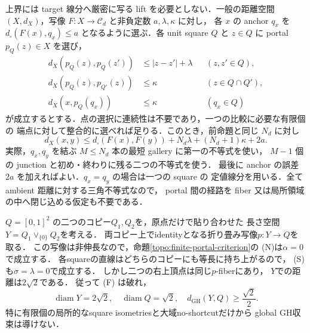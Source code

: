 \begin{remark}
\label{topo:finite-endpoint-comparison}
上界には target 線分へ厳密に写る lift を必要としない．一般の距離空間
$(X,d_X)$，写像 $F:X\to\mathcal C_d$ と非負定数 $a,\lambda,\kappa$ に対し，
各 $x$ の anchor $q_x$ を
$d_\square(F(x),q_x)\le a$ となるように選ぶ．各 unit square $Q$ と $z\in Q$ に
portal $p_Q(z)\in X$ を選び，
\[
 \begin{aligned}
 d_X(p_Q(z),p_Q(z'))&\le |z-z'|+\lambda &&(z,z'\in Q),\\
 d_X(p_Q(z),p_{Q'}(z))&\le\kappa &&(z\in Q\cap Q'),\\
 d_X(x,p_Q(q_x))&\le\kappa &&(q_x\in Q)
 \end{aligned}
\]
が成立するとする．点の選択に連続性は不要であり，一つの比較に必要な有限個の
端点に対して整合的に選べれば足りる．このとき，前命題と同じ $N_d$ に対し
\[
 d_X(x,y)\le d_\square(F(x),F(y))
       +N_d\lambda+(N_d+1)\kappa+2a .
\]
実際，$q_x,q_y$ を結ぶ $M\le N_d$ 本の最短 gallery に第一の不等式を使い，
$M-1$ 個の junction と初め・終わりに残る二つの不等式を使う．
最後に anchor の誤差 $2a$ を加えればよい．$q_x=q_y$ の場合は一つの square の
定値線分を用いる．全て ambient 距離に対する三角不等式なので，
portal 間の経路を fiber 又は局所領域の中へ閉じ込める仮定も不要である．
\end{remark}

\begin{example}[各squareの局所モデルだけでは不十分]
\label{topo:portal-counterexample}
$Q=[0,1]^2$ の二つのコピー$Q_1,Q_2$を，原点だけで貼り合わせた
長さ空間$Y=Q_1\vee_{\{0\}}Q_2$を考える．
両コピー上でidentityとなる折り畳み写像$p:Y\to Q$を取る．
この写像は非伸長なので，命題\ref{topo:finite-portal-criterion}の
\textup{(N)}は$\alpha=0$で成立する．
各squareの直線はどちらのコピーにも等長に持ち上がるので，
\textup{(S)}も$\sigma=\lambda=0$で成立する．
しかし二つの右上頂点は同じ$p$-fiberにあり，
$Y$での距離は$2\sqrt2$である．
従って \textup{(F)} は破れ，
\[
 \operatorname{diam}Y=2\sqrt2,\quad
 \operatorname{diam}Q=\sqrt2,\quad
 d_{\mathrm{GH}}(Y,Q)\ge\frac{\sqrt2}{2}.
\]
特に有限個の局所的なsquare isometriesと大域no-shortcutだけから
global GH収束は導けない．
\end{example}

